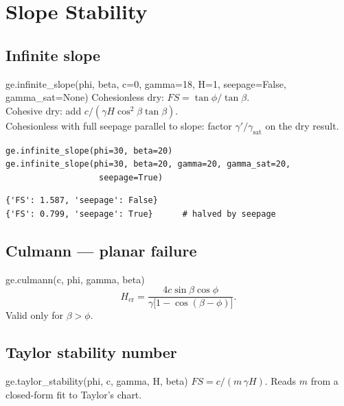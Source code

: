 \documentclass[11pt,a4paper,openany]{book}
\begin{document}
\chapter{Slope Stability}\label{ch:slopes}

\section{Infinite slope}

\begin{funcbox}{ge.infinite\_slope(phi, beta, c=0, gamma=18, H=1, seepage=False, gamma\_sat=None)}
Cohesionless dry: $FS = \tan\phi/\tan\beta$.\\
Cohesive dry: add $c / (\gamma H \cos^2\beta\tan\beta)$.\\
Cohesionless with full seepage parallel to slope: factor
$\gamma'/\gamma_{\text{sat}}$ on the dry result.
\end{funcbox}

\begin{lstlisting}
ge.infinite_slope(phi=30, beta=20)
ge.infinite_slope(phi=30, beta=20, gamma=20, gamma_sat=20,
                   seepage=True)
\end{lstlisting}
\begin{lstlisting}[style=output]
{'FS': 1.587, 'seepage': False}
{'FS': 0.799, 'seepage': True}      # halved by seepage
\end{lstlisting}

\section{Culmann --- planar failure}

\begin{funcbox}{ge.culmann(c, phi, gamma, beta)}
\[
H_{\text{cr}} = \frac{4 c\sin\beta\cos\phi}{\gamma\bigl[1 - \cos(\beta - \phi)\bigr]}.
\]
Valid only for $\beta > \phi$.
\end{funcbox}

\section{Taylor stability number}

\begin{funcbox}{ge.taylor\_stability(phi, c, gamma, H, beta)}
$FS = c / (m\,\gamma H)$. Reads $m$ from a closed-form fit to
Taylor's chart.
\end{funcbox}
\end{document}
